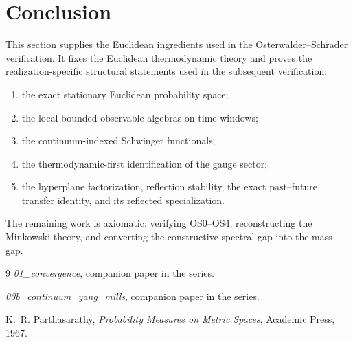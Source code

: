 \documentclass[11pt]{article}
\theoremstyle{definition}
\theoremstyle{remark}
\begin{document}
\section{Conclusion}

This section supplies the Euclidean ingredients used in the Osterwalder--Schrader verification.  It fixes
the Euclidean thermodynamic theory and proves the realization-specific
structural statements used in the subsequent verification:
\begin{enumerate}[leftmargin=1.5em]
\item the exact stationary Euclidean probability space;
\item the local bounded observable algebras on time windows;
\item the continuum-indexed Schwinger functionals;
\item the thermodynamic-first identification of the gauge sector;
\item the hyperplane factorization, reflection stability, the exact past--future
transfer identity, and its reflected specialization.
\end{enumerate}
The remaining work is axiomatic: verifying OS0--OS4,
reconstructing the Minkowski theory, and converting the constructive spectral
gap into the mass gap.

\begin{thebibliography}{9}
\emph{01\_convergence}, companion paper in the series.

\emph{03b\_continuum\_yang\_mills}, companion paper in the series.

K.~R. Parthasarathy,
\emph{Probability Measures on Metric Spaces},
Academic Press, 1967.
\end{thebibliography}
\end{document}
